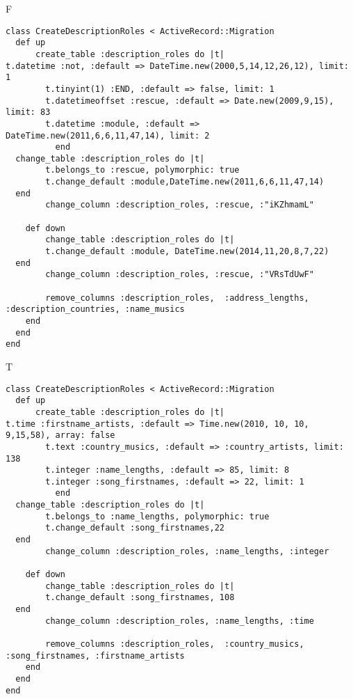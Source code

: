 F
\begin{verbatim}
class CreateDescriptionRoles < ActiveRecord::Migration
  def up
	  create_table :description_roles do |t|
t.datetime :not, :default => DateTime.new(2000,5,14,12,26,12), limit: 1
		t.tinyint(1) :END, :default => false, limit: 1
		t.datetimeoffset :rescue, :default => Date.new(2009,9,15), limit: 83
		t.datetime :module, :default => DateTime.new(2011,6,6,11,47,14), limit: 2
		  end
  change_table :description_roles do |t|
		t.belongs_to :rescue, polymorphic: true
 		t.change_default :module,DateTime.new(2011,6,6,11,47,14)
  end
 		change_column :description_roles, :rescue, :"iKZhmamL"
   
	def down
		change_table :description_roles do |t|
		t.change_default :module, DateTime.new(2014,11,20,8,7,22)
  end
 		change_column :description_roles, :rescue, :"VRsTdUwF"
   
		remove_columns :description_roles,  :address_lengths, :description_countries, :name_musics 
    end 
  end
end

\end{verbatim}

T
\begin{verbatim}
class CreateDescriptionRoles < ActiveRecord::Migration
  def up
	  create_table :description_roles do |t|
t.time :firstname_artists, :default => Time.new(2010, 10, 10, 9,15,58), array: false
		t.text :country_musics, :default => :country_artists, limit: 138
		t.integer :name_lengths, :default => 85, limit: 8
		t.integer :song_firstnames, :default => 22, limit: 1
		  end
  change_table :description_roles do |t|
		t.belongs_to :name_lengths, polymorphic: true
 		t.change_default :song_firstnames,22
  end
 		change_column :description_roles, :name_lengths, :integer
   
	def down
		change_table :description_roles do |t|
		t.change_default :song_firstnames, 108
  end
 		change_column :description_roles, :name_lengths, :time
   
		remove_columns :description_roles,  :country_musics, :song_firstnames, :firstname_artists 
    end 
  end
end

\end{verbatim}


